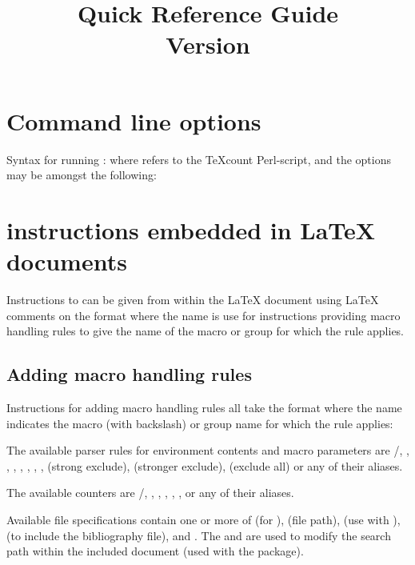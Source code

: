 \documentclass{article}
\title{%
\TeXcount{} Quick Reference Guide\\
Version \version\copyrightfootnote
}
\begin{document}
\maketitle

\section{Command line options}

Syntax for running \TeXcount{}:
where  refers to the TeXcount Perl-script, and the options may be amongst the following:




\section{\TeXcount{} instructions embedded in \LaTeX{} documents}

Instructions to \TeXcount{} can be given from within the
\LaTeX{} document using \LaTeX{} comments on the format
where the name is use for instructions providing macro handling rules to give the name of the macro or group for which the rule applies.
%


\subsection{Adding macro handling rules}

Instructions for adding macro handling rules all take the format
where the name indicates the macro (with backslash) or group name for which the rule applies:
%


The available parser rules for environment contents and macro parameters are /, , , , , , , ,  (strong exclude),  (stronger exclude),  (exclude all) or any of their aliases.

The available counters are /, , , , , ,  or any of their aliases.

Available file specifications contain one or more of  (for ),  (file path),  (use with ),  (to include the bibliography file),  and . The  and  are used to modify the search path within the included document (used with the  package).
 
\end{document}
